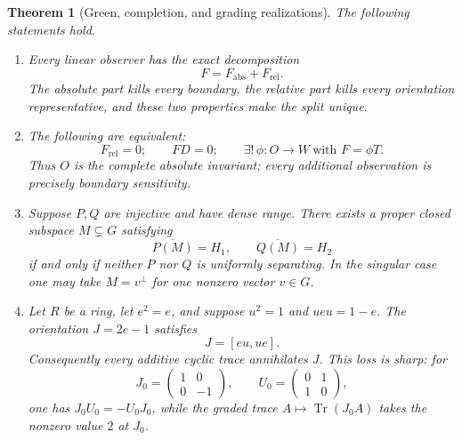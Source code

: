 \documentclass[11pt]{article}
\newtheorem{theorem}{Theorem}[section]
\theoremstyle{definition}
\theoremstyle{remark}
\newcommand{\Tr}{\operatorname{Tr}}
\begin{document}
\begin{theorem}[Green, completion, and grading realizations]
\label{thm:boundary-completeness}
The following statements hold.

\begin{enumerate}[label=\textup{(\alph*)},leftmargin=2.2em]
\item Every linear observer has the exact decomposition
      \[
                         F=F_{\mathrm{abs}}+F_{\mathrm{rel}}.
      \tag{2.5}\label{eq:canonical-split}
      \]
      The absolute part kills every boundary, the relative part kills every
      orientation representative, and these two properties make the split
      unique.

\item The following are equivalent:
      \[
      F_{\mathrm{rel}}=0;
      \qquad FD=0;
      \qquad
      \exists!\,\phi:O\to W\ \text{with }F=\phi T.
      \tag{2.6}\label{eq:factor-classification}
      \]
      Thus \(O\) is the complete absolute invariant; every additional
      observation is precisely boundary sensitivity.

\item Suppose \(P,Q\) are injective and have dense range.  There exists a
      proper closed subspace \(M\subsetneq G\) satisfying
      \[
                   \overline{P(M)}=H_1,
                   \qquad \overline{Q(M)}=H_2
      \tag{2.7}\label{eq:bidense}
      \]
      if and only if neither \(P\) nor \(Q\) is uniformly separating.  In
      the singular case one may take \(M=v^\perp\) for one nonzero vector
      \(v\in G\).

\item Let \(R\) be a ring, let \(e^2=e\), and suppose \(u^2=1\) and
      \(ueu=1-e\).  The orientation \(J=2e-1\) satisfies
      \[
                         J=[eu,ue].
      \tag{2.8}\label{eq:orientation-commutator}
      \]
      Consequently every additive cyclic trace annihilates \(J\).  This
      loss is sharp: for
      \[
      J_0=\begin{pmatrix}1&0\\0&-1\end{pmatrix},\qquad
      U_0=\begin{pmatrix}0&1\\1&0\end{pmatrix},
      \tag{2.9}\label{eq:matrix-pair}
      \]
      one has \(J_0U_0=-U_0J_0\), while the graded trace
      \(A\mapsto\Tr(J_0A)\) takes the nonzero value \(2\) at \(J_0\).
\end{enumerate}
\end{theorem}
\end{document}
